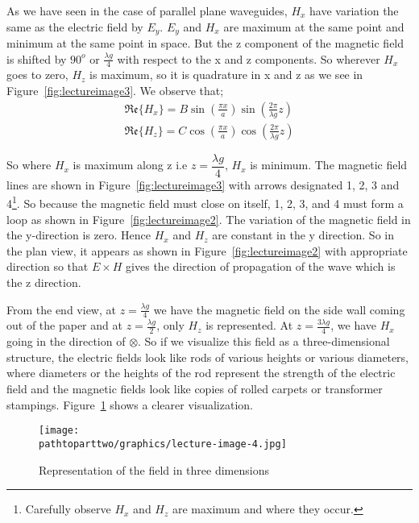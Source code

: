 As we have seen in the case of parallel plane waveguides, $H_{x}$ have variation the same as the electric field by $E_{y}$. $E_{y}$ and $H_{x}$ are maximum at the same point and minimum at the same point in space. But the z component of the magnetic field is shifted by $90^{o}$ or $\frac{\lambda g}{4}$ with respect to the x and z components. So wherever $H_{x}$ goes to zero, $H_{z}$ is maximum, so it is quadrature in x and z as we see in Figure~\ref{fig:lectureimage3}. We observe that;
\begin{align}
\mathfrak{Re}\{H_{x}\} = B\sin(\frac{\pi x}{a})\sin(\frac{2\pi}{\lambda g}z)\\
\mathfrak{Re}\{H_z\} = C\cos(\frac{\pi x}{a})\cos(\frac{2\pi}{\lambda g}z)
\end{align}

So where $H_{x}$ is maximum along z i.e  $z=\dfrac{\lambda g}{4}$, $H_{x}$ is minimum. The magnetic field lines are shown in Figure~\ref{fig:lectureimage3} with arrows designated 1, 2, 3 and 4\footnote{
Carefully observe $H_{x}$ and $H_{z}$ are maximum and where they occur.
}. So because the magnetic field must close on itself, 1, 2, 3, and 4 must form a loop as shown in Figure~\ref{fig:lectureimage2}. The variation of the magnetic field in the y-direction is zero. Hence $H_{x}$ and $H_{z}$ are constant in the y direction. So in the plan view, it appears as shown in Figure~\ref{fig:lectureimage2} with appropriate direction so that $E\times H$ gives the direction of propagation of the wave which is the z direction.

From the end view, at $z=\frac{\lambda g}{4}$ we have the magnetic field on the side wall coming out of the paper and at $z=\frac{\lambda g}{2}$, only $H_{z}$ is represented. At $z=\frac{3\lambda g}{4}$, we have $H_{x}$ going in the direction of $\otimes$. So if we visualize this field as a three-dimensional structure, the electric fields look like rods of various heights or various diameters, where diameters or the heights of the rod represent the strength of the electric field and the magnetic fields look like copies of rolled carpets or transformer stampings. Figure~\ref{fig:lectureimage4} shows a clearer visualization.
\begin{figure}[h]
\centering
\texttt{[image: \\pathtoparttwo/graphics/lecture-image-4.jpg]}
\caption{Representation of the field in three dimensions}
\label{fig:lectureimage4}
\end{figure}

